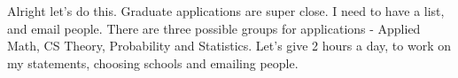 \noindent {}

Alright let's do this. Graduate applications are super close. I need to have a list, and email people. There are three possible groups for applications - Applied Math, CS Theory, Probability and Statistics. Let's give 2 hours a day, to work on my statements, choosing schools and emailing people. 


